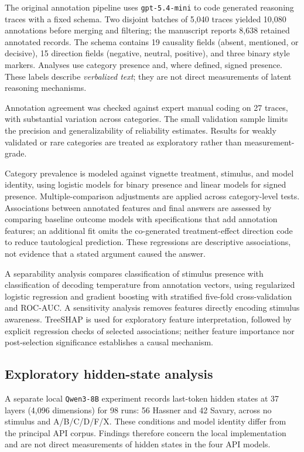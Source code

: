 The original annotation pipeline uses \texttt{gpt-5.4-mini} to code generated reasoning traces with a fixed schema. Two disjoint batches of 5{,}040 traces yielded 10{,}080 annotations before merging and filtering; the manuscript reports 8{,}638 retained annotated records. The schema contains 19 causality fields (absent, mentioned, or decisive), 15 direction fields (negative, neutral, positive), and three binary style markers. Analyses use category presence and, where defined, signed presence. These labels describe \emph{verbalized text}; they are not direct measurements of latent reasoning mechanisms.

Annotation agreement was checked against expert manual coding on 27 traces, with substantial variation across categories. The small validation sample limits the precision and generalizability of reliability estimates. Results for weakly validated or rare categories are treated as exploratory rather than measurement-grade.

Category prevalence is modeled against vignette treatment, stimulus, and model identity, using logistic models for binary presence and linear models for signed presence. Multiple-comparison adjustments are applied across category-level tests. Associations between annotated features and final answers are assessed by comparing baseline outcome models with specifications that add annotation features; an additional fit omits the co-generated treatment-effect direction code to reduce tautological prediction. These regressions are descriptive associations, not evidence that a stated argument caused the answer.

A separability analysis compares classification of stimulus presence with classification of decoding temperature from annotation vectors, using regularized logistic regression and gradient boosting with stratified five-fold cross-validation and ROC-AUC. A sensitivity analysis removes features directly encoding stimulus awareness. TreeSHAP is used for exploratory feature interpretation, followed by explicit regression checks of selected associations; neither feature importance nor post-selection significance establishes a causal mechanism.

\subsection{Exploratory hidden-state analysis}

A separate local \texttt{Qwen3-8B} experiment records last-token hidden states at 37 layers (4{,}096 dimensions) for 98 runs: 56 Hassner and 42 Savary, across no stimulus and A/B/C/D/F/X. These conditions and model identity differ from the principal API corpus. Findings therefore concern the local implementation and are not direct measurements of hidden states in the four API models.

